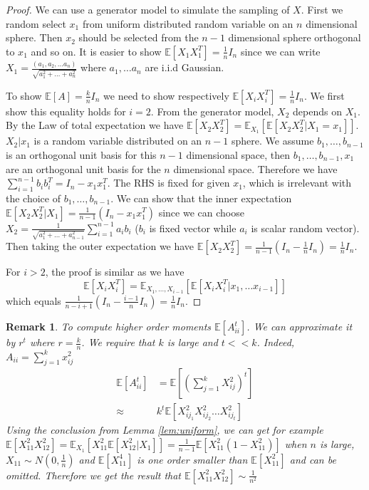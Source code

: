 \documentclass{article}
\def\E{\mathbb{E}}
\newtheorem{remark}{Remark}
\begin{document}
\begin{proof}
We can use a generator model to simulate the sampling of $X$. First we random select $x_1$ from uniform distributed random variable on an $n$ dimensional sphere. Then $x_2$ should be selected from the $n-1$ dimensional sphere orthogonal to $x_1$ and so on.
It is easier to show $\E[X_1X_1^T] = \frac{1}{n} I_n$ since we can write $X_1 = \frac{(a_1, a_2, \dots a_n) }{\sqrt{a_1^2+\dots + a_n^2}}$ where $a_1, \dots a_n$ are i.i.d Gaussian.

To show $\E[A]=\frac{k}{n}I_n$ we need to show respectively $\E[X_iX_i^T]=\frac{1}{n} I_n$. We first show this equality holds for $i=2$. From the generator model, $X_2$ depends on $X_1$. By the Law of total expectation we have $\E[X_2 X_2^T] = \E_{X_1}[\E[X_2 X_2^T |X_1 = x_1]]$. $X_2 | x_1$ is a random variable distributed on an $n-1$ sphere. We assume $b_1, \dots, b_{n-1}$ is an orthogonal unit basis for this $n-1$ dimensional space,
then $b_1, \dots, b_{n-1}, x_1$ are an orthogonal unit basis for the $n$ dimensional space. Therefore we have
$\sum_{i=1}^{n-1} b_i b_i^T = I_n -  x_1 x_1^T $. The RHS is fixed for given $x_1$, which is irrelevant with the choice of $b_1, \dots, b_{n-1}$. We can show that the inner expectation $\E[X_2 X_2^T |X_1] = \frac{1}{n-1}(I_n - x_1 x_1^T)$ since we can choose $X_2 = \frac{1}{\sqrt{a_1^2 + \dots + a_{n-1}^2}} \sum_{i=1}^{n-1} a_i b_i$ ($b_i$ is fixed vector while $a_i$ is scalar random vector). Then taking the outer expectation we have $\E[X_2 X_2^T] = \frac{1}{n-1} (I_n - \frac{1}{n} I_n) = \frac{1}{n} I_n$.

For $i>2$, the proof is similar as we have $$
\E[X_i X_i^T] = \E_{X_1, \dots, X_{i-1}} [\E[X_i X_i^T | x_1, \dots x_{i-1}]]
$$
 which equals $\frac{1}{n-i+1}(I_n - \frac{i-1}{n} I_n) = \frac{1}{n} I_n$.
\end{proof}
\begin{remark}
To compute higher order moments $\E[A_{ii}^t]$. We can approximate it by $r^t$ where $r=\frac{k}{n}$. We require that $k$ is large and  $ t << k$.
Indeed, $A_{ii} = \sum_{j=1}^k x_{ij}^2$
\begin{align*}
\E[A^t_{ii}] & = \E[(\sum_{j=1}^k X_{ij}^2)^t] \\
\approx & k^t \E[X^2_{ij_1}X^2_{ij_2}\dots X^2_{ij_t}]
\end{align*}
Using the conclusion from Lemma \ref{lem:uniform}, we can get for example $\E[X_{11}^2 X_{12}^2]
= \E_{X_1}[X_{11}^2 \E[ X^2_{12}| X_1]] = \frac{1}{n-1}\E[X_{11}^2 ( 1 - X_{11}^2 )]$ when $n$ is large,
$X_{11} \sim N(0, \frac{1}{n})$ and $\E[X_{11}^4]$ is one order smaller than $\E[X_{11}^2]$ and can be  omitted. Therefore we get the result that $\E[X_{11}^2 X_{12}^2] \sim \frac{1}{n^2}$
\end{remark}
\end{document}
